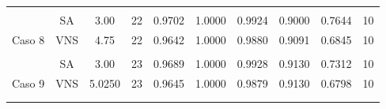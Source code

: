 \begin{table}
{\begin{tabular}{cccccccccc}
			&     &                                                                      &                                                                    &                                                         &        &        &        &        &              \\
			\multicolumn{1}{c|}{}                         & SA  & 3.00                                                                 & 22                                                                 & 0.9702                                                  & 1.0000 & 0.9924 & 0.9000 & 0.7644 & 10           \\
			\multicolumn{1}{c|}{\multirow{-2}{*}{Caso 8}} & VNS & 4.75                                                               & 22                                                                 & 0.9642                                                  & 1.0000 & 0.9880 & 0.9091 & 0.6845 & 10           \\
			&     &                                                                      &                                                                    &                                                         &        &        &        &        &              \\
			\multicolumn{1}{c|}{}                         & SA  & 3.00                                                                 & 23                                                                 & 0.9689                                                  & 1.0000 & 0.9928 & 0.9130 & 0.7312 & 10           \\
			\multicolumn{1}{c|}{\multirow{-2}{*}{Caso 9}} & VNS & 5.0250                                                               & 23                                                                 & 0.9645                                                  & 1.0000 & 0.9879 & 0.9130 & 0.6798 & 10           \\
			&     &                                                                      &                                                                    &                                                         &        &        &        &        &              \\
			\multicolumn{10}{c}{}                                                                                                                                                                                                                                                                                        \\ \hline
		\end{tabular}%
	}
\end{table}

